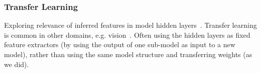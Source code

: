\subsubsection{Transfer Learning}

Exploring relevance of inferred features in model hidden layers~\cite{Yosinski2014}. Transfer learning is common in other domains, e.g. vision~\cite{Razavian2014,Oquab2014}. Often using the hidden layers as fixed feature extractors (by using the output of one sub-model as input to a new model), rather than using the same model structure and transferring weights (as we did).
